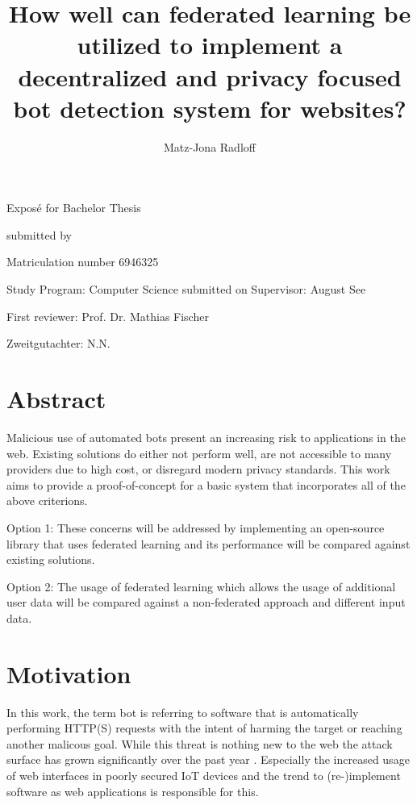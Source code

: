 \documentclass[
    fontsize=12pt,
    headings=small,
    parskip=half,           %
    bibliography=totoc,
    numbers=noenddot,       %
    open=any,               %
    final                   %
    ]{scrreprt}
\title{How well can federated learning be utilized to implement a decentralized and privacy focused bot detection system for websites?}
\author{Matz-Jona Radloff}
\begin{document}
\begin{titlepage}
\begin{center}\Large
	\vfill
    Exposé for Bachelor Thesis
	\vfill
	\makeatletter
	{\Large\textsf{\textbf{\@title}}\par}
	\makeatother
	\vfill
    submitted by
	\par\bigskip
	\makeatletter
	{\@author} \par
	\makeatother
	Matriculation number 6946325 \par
	Study Program: Computer Science
	\vfill
	\makeatletter
	submitted on {\@date}
	\makeatother
	\vfill
	Supervisor: August See\par
	First reviewer: Prof. Dr. Mathias Fischer \par
	Zweitgutachter: N.N.
\end{center}
\end{titlepage}


\chapter*{Abstract}

Malicious use of automated bots present an increasing risk to applications in the web. Existing solutions do either not perform well, are not accessible to many providers due to high cost, or disregard modern privacy standards. This work aims to provide a proof-of-concept for a basic system that incorporates all of the above criterions.

Option 1:
These concerns will be addressed by implementing an open-source library that uses federated learning and its performance will be compared against existing solutions.

Option 2:
The usage of federated learning which allows the usage of additional user data will be compared against a non-federated approach and different input data.

\tableofcontents

\chapter{Motivation}

In this work, the term bot is referring to software that is automatically performing HTTP(S) requests with the intent of harming the target or reaching another malicous goal. While this threat is nothing new to the web the attack surface has grown significantly over the past year \cite{BAD_BOT_REPORT2020} \cite{BAD_BOT_REPORT2021}. Especially the increased usage of web interfaces in poorly secured IoT devices and the trend to (re-)implement software as web applications is responsible for this.
\end{document}
